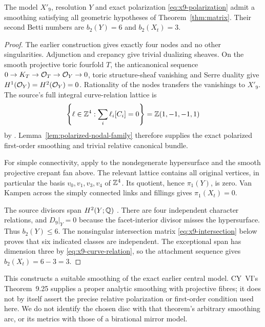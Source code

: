 \begin{proposition}\label{prop:x9-family}
The model $X'_9$, resolution $Y$ and exact polarization
\eqref{eq:x9-polarization} admit a smoothing satisfying all geometric
hypotheses of Theorem~\ref{thm:matrix}. Their second Betti numbers
are $b_2(Y)=6$ and $b_2(X_t)=3$.
\end{proposition}
\begin{proof}
The earlier construction gives exactly four nodes and no other
singularities. Adjunction and crepancy give trivial dualizing sheaves.
On the smooth projective toric fourfold $T$, the anticanonical sequence
$0\to K_T\to\mathcal O_T\to\mathcal O_Y\to0$, toric structure-sheaf
vanishing and Serre duality give $H^1(\mathcal O_Y)=H^2(\mathcal O_Y)=0$.
Rationality of the nodes transfers the vanishings to $X'_9$.
The source's full integral curve-relation lattice is
\begin{equation}\label{eq:x9-curve-relation}
 \left\{\ell\in\mathbb Z^4:\sum_i\ell_i[C_i]=0\right\}
 =\mathbb Z(1,-1,-1,1)
\end{equation}
by \cite[Proposition~3.5 and Section~11.1]{wuebben-cy-mirror}.
Lemma~\ref{lem:polarized-nodal-family} therefore supplies the exact
polarized first-order smoothing and trivial relative canonical bundle.

For simple connectivity, apply
\cite[Corollary~1.9]{batyrev-kreuzer} to the nondegenerate hypersurface
and the smooth projective crepant fan above. The relevant lattice
contains all original vertices, in particular the basis
$v_0,v_1,v_3,v_4$ of $\mathbb Z^4$. Its quotient, hence $\pi_1(Y)$,
is zero. Van Kampen across the simply connected links and fillings
gives $\pi_1(X_t)=0$.

The source divisors span $H^2(Y;\mathbb Q)$
\cite[Lemma~3.3]{wuebben-cy-mirror}. There are four independent
character relations, and $D_9|_Y=0$ because the facet-interior divisor
misses the hypersurface. Thus $b_2(Y)\le6$. The nonsingular
intersection matrix \eqref{eq:x9-intersection} below proves that
six indicated classes are independent. The exceptional span has
dimension three by \eqref{eq:x9-curve-relation}, so the attachment
sequence gives $b_2(X_t)=6-3=3$.
\end{proof}

This constructs a suitable smoothing of the exact earlier central
model. CY~VI's Theorem~9.25 supplies a proper analytic smoothing with
projective fibres; it does not by itself assert the precise relative
polarization or first-order condition used here. We do not identify
the chosen disc with that theorem's arbitrary smoothing arc, or its
metrics with those of a birational mirror model.

